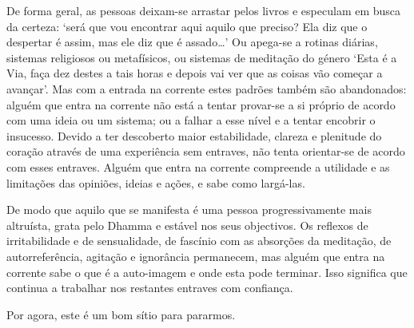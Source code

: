 De forma geral, as pessoas deixam-se arrastar pelos livros e especulam em busca da certeza: `será que vou encontrar aqui aquilo que preciso? Ela diz que o despertar é assim, mas ele diz que é assado\ldots{}' Ou apega-se a rotinas diárias, sistemas religiosos ou metafísicos, ou sistemas de meditação do género `Esta é a Via, faça dez destes a tais horas e depois vai ver que as coisas vão começar a avançar'. Mas com a entrada na corrente estes padrões também são abandonados: alguém que entra na corrente não está a tentar provar-se a si próprio de acordo com uma ideia ou um sistema; ou a falhar a esse nível e a tentar encobrir o insucesso. Devido a ter descoberto maior estabilidade, clareza e plenitude do coração através de uma experiência sem entraves, não tenta orientar-se de acordo com esses entraves. Alguém que entra na corrente compreende a utilidade e as limitações das opiniões, ideias e ações, e sabe como largá-las.

De modo que aquilo que se manifesta é uma pessoa progressivamente mais altruísta, grata pelo Dhamma e estável nos seus objectivos. Os reflexos de irritabilidade e de sensualidade, de fascínio com as absorções da meditação, de autorreferência, agitação e ignorância permanecem, mas alguém que entra na corrente sabe o que é a auto-imagem e onde esta pode terminar. Isso significa que continua a trabalhar nos restantes entraves com confiança.

Por agora, este é um bom sítio para pararmos.
